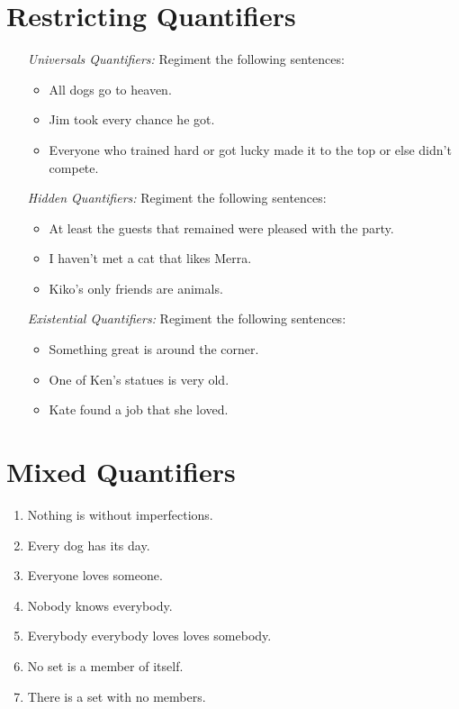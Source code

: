 \documentclass[a4paper, 11pt]{article} %
\begin{document}
\section*{Restricting Quantifiers}

\begin{enumerate}
  \item[\it Universals Quantifiers:] Regiment the following sentences:
    \begin{itemize}
      \item All dogs go to heaven.
      \item Jim took every chance he got.
      \item Everyone who trained hard or got lucky made it to the top or else didn't compete.
    \end{itemize}
  \item[\it Hidden Quantifiers:] Regiment the following sentences:
    \begin{itemize}
      \item At least the guests that remained were pleased with the party.
      \item I haven't met a cat that likes Merra.
      \item Kiko's only friends are animals.
    \end{itemize}
  \item[\it Existential Quantifiers:] Regiment the following sentences: 
    \begin{itemize}
      \item Something great is around the corner.
      \item One of Ken's statues is very old.
      \item Kate found a job that she loved.
    \end{itemize}
\end{enumerate}





\section*{Mixed Quantifiers}

\begin{enumerate}
  \item Nothing is without imperfections.
  \item Every dog has its day.
  \item Everyone loves someone.
  \item Nobody knows everybody.
  \item Everybody everybody loves loves somebody.
  \item No set is a member of itself.
  \item There is a set with no members.
\end{enumerate}
\end{document}
